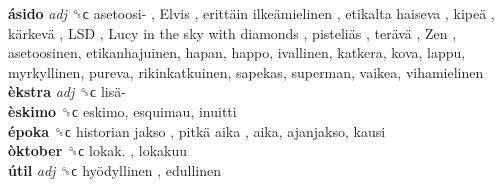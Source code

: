 \textbf{ásido} \emph{adj}  ␝ϲ   asetoosi- ,  Elvis ,  erittäin ilkeämielinen ,  etikalta haiseva ,  kipeä ,  kärkevä ,  LSD ,  Lucy in the sky with diamonds ,  pisteliäs ,  terävä ,  Zen , asetoosinen, etikanhajuinen, hapan, happo, ivallinen, katkera, kova, lappu, myrkyllinen, pureva, rikinkatkuinen, sapekas, superman, vaikea, vihamielinen  \\
\textbf{èkstra} \emph{adj}  ␝ϲ   lisä-   \\
\textbf{èskimo} ␝ϲ  eskimo, esquimau, inuitti  \\
\textbf{époka} ␝ϲ   historian jakso ,  pitkä aika , aika, ajanjakso, kausi  \\
\textbf{òktober} ␝ϲ   lokak. , lokakuu  \\
\textbf{útil} \emph{adj}  ␝ϲ   hyödyllinen , edullinen  \\
